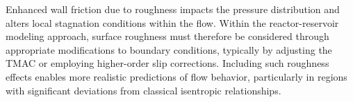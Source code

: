 	Enhanced wall friction due to roughness impacts the pressure distribution and alters local stagnation conditions within the flow.
	Within the reactor-reservoir modeling approach, surface roughness must therefore be considered through appropriate modifications to boundary conditions, typically by adjusting the TMAC or employing higher-order slip corrections.
	Including such roughness effects enables more realistic predictions of flow behavior, particularly in regions with significant deviations from classical isentropic relationships.
	\cite{agrawal_comprehensive_2011, wang_analyses_2008}
